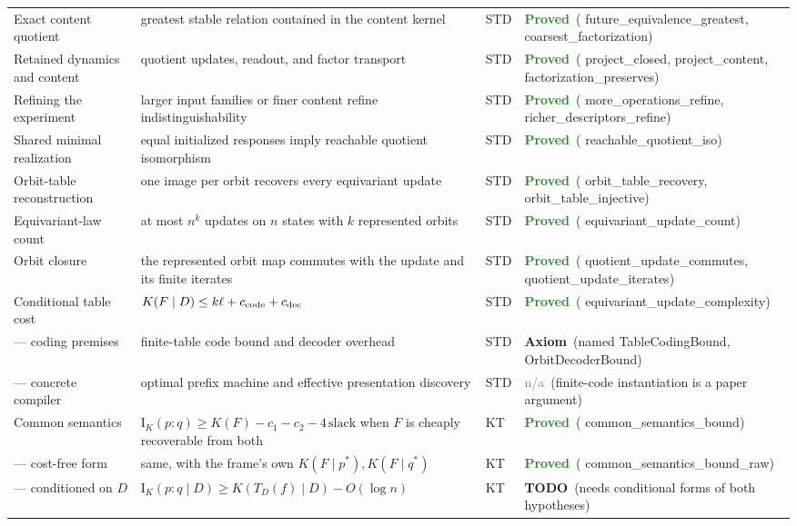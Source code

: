 \documentclass[11pt,a4paper]{article}
\newcommand{\lean}[1]{{\ttfamily\small
  \let\leanunderscore\_\def\_{\leanunderscore\allowbreak}#1}}
\newcommand{\Ik}{\mathrm{I}_K}
\newcommand{\stproved}{\textcolor{ForestGreen}{\textbf{Proved}}}
\newcommand{\staxiom}{\textcolor{bcomblue}{\textbf{Axiom}}}
\newcommand{\sttodo}{\textcolor{bcomcoral}{\textbf{TODO}}}
\newcommand{\stna}{\textcolor{gray}{n/a}}
\begin{document}
{\begin{longtable}{@{}p{2.1cm}p{6.6cm}p{1.0cm}p{2.6cm}@{}}
\midrule
Exact content quotient & greatest stable relation contained in the content kernel & STD &
  \stproved\ (\lean{future\_equivalence\_greatest}, \lean{coarsest\_factorization}) \\
Retained dynamics and content & quotient updates, readout, and factor transport & STD &
  \stproved\ (\lean{project\_closed}, \lean{project\_content}, \lean{factorization\_preserves}) \\
Refining the experiment & larger input families or finer content refine indistinguishability & STD &
  \stproved\ (\lean{more\_operations\_refine}, \lean{richer\_descriptors\_refine}) \\
Shared minimal realization & equal initialized responses imply reachable quotient isomorphism & STD &
  \stproved\ (\lean{reachable\_quotient\_iso}) \\
Orbit-table reconstruction & one image per orbit recovers every equivariant update & STD &
  \stproved\ (\lean{orbit\_table\_recovery}, \lean{orbit\_table\_injective}) \\
Equivariant-law count & at most $n^k$ updates on $n$ states with $k$ represented orbits & STD &
  \stproved\ (\lean{equivariant\_update\_count}) \\
Orbit closure & the represented orbit map commutes with the update and its finite iterates & STD &
  \stproved\ (\lean{quotient\_update\_commutes}, \lean{quotient\_update\_iterates}) \\
Conditional table cost & $K(F\mid D)\le k\ell+c_{\rm code}+c_{\rm dec}$ & STD &
  \stproved\ (\lean{equivariant\_update\_complexity}) \\
--- coding premises & finite-table code bound and decoder overhead & STD &
  \staxiom\ (named \lean{TableCodingBound}, \lean{OrbitDecoderBound}) \\
--- concrete compiler & optimal prefix machine and effective presentation discovery & STD &
  \stna\ (finite-code instantiation is a paper argument) \\
Common semantics & $\Ik(p{:}q)\ge K(F)-c_1-c_2-4\,\mathrm{slack}$ when $F$ is cheaply
  recoverable from both & KT & \stproved\ (\lean{common\_semantics\_bound}) \\
--- cost-free form & same, with the frame's own $K(F\mid p^\ast),K(F\mid q^\ast)$ & KT &
  \stproved\ (\lean{common\_semantics\_bound\_raw}) \\
--- conditioned on $D$ & $\Ik(p{:}q\mid D)\ge K(T_D(f)\mid D)-O(\log n)$ & KT &
  \sttodo\ (needs conditional forms of both hypotheses) \\

\end{longtable}}
\end{document}
